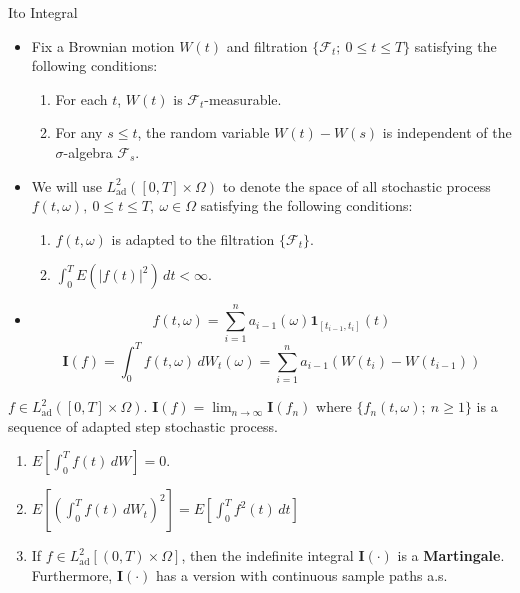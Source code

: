 \documentclass[final]{beamer}
\newlength{\colwidth}
\begin{document}
\begin{frame}[t]
\begin{columns}[t]
\begin{column}{\colwidth}
\begin{block}{It$\hat{\text{o}}$ Integral}
    \begin{itemize}
       \item Fix a Brownian motion $W(t)$ and filtration $\{ \mathcal{F}_t; \ 0 \leq t \leq T \}$ satisfying the following conditions:
       \begin{enumerate}
           \item For each $t$, $W(t)$ is $\mathcal{F}_t$-measurable.
           \item For any $s \leq t$, the random variable $W(t) - W(s)$ is independent of the $\sigma$-algebra $\mathcal{F}_s$.
       \end{enumerate}
       \item We will use $L_\text{ad}^2([0,T] \times \Omega)$ to denote the space of all stochastic process $f(t,\omega), \ 0 \leq t \leq T, \ \omega \in \Omega$ satisfying the following conditions:
       \begin{enumerate}
           \item $f(t,\omega)$ is adapted to the filtration $\{\mathcal{F}_t\}$.
           \item $\int_0^T{E({\left | f(t) \right |}^2)}\,dt < \infty$.
       \end{enumerate}
        \item \[f(t,\omega) = \sum_{i=1}^{n}{a_{i-1}(\omega)\mathbf{1}_{[t_{i-1},t_i]}(t)}\]
        \[\mathbf{I}(f) = \int_0^T f(t,\omega)\,dW_t(\omega) = \sum_{i=1}^n{a_{i-1}(W(t_i) - W(t_{i-1}))}\]
           \end{itemize}
         $f \in L_\text{ad}^2([0,T] \times \Omega)$. $\mathbf{I}(f) = \lim_{n \rightarrow \infty}\mathbf{I}(f_n)$ where $\{f_n(t,\omega); \ n \geq 1\}$ is a sequence of adapted step stochastic process.
        \begin{enumerate}
            \item ${E}[\int_0^T f(t)\,dW] = 0$.
          \item ${E}[(\int_0^T f(t)\,dW_t)^{2}] = E[\int_0^T f^{2}(t)\,dt]$ 
          \item If $f \in L^2_\text{ad}[(0,T) \times \Omega]$, then the indefinite integral $\mathbf{I}(\cdot)$ is a \textbf{Martingale}. Furthermore, $\mathbf{I}(\cdot)$ has a version with continuous sample paths a.s.
        \end{enumerate}

 

  \end{block}
  

\end{column}
\end{columns}
\end{frame}
\end{document}
